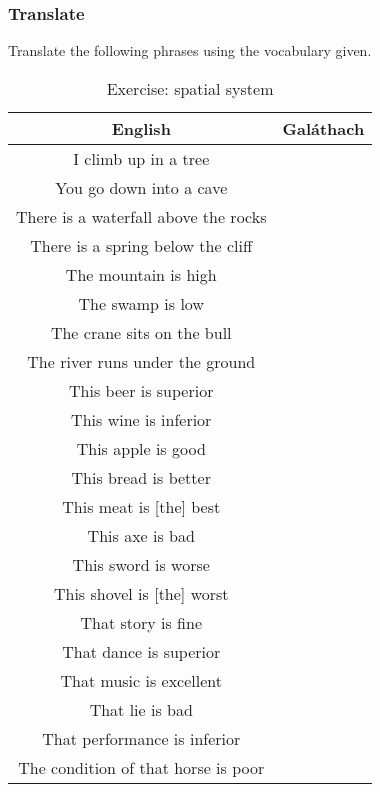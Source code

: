 \subsubsection{Translate}

Translate the following phrases using the vocabulary given.

\begin{table}[H]
\centering
\begin{tabular}{|c|M{5.0cm}|}
  \toprule
  \textbf{English} & \textbf{Gal\'{a}thach}\\
  \toprule
  I climb up in a tree & \\
  \midrule
  You go down into a cave & \\
  \midrule
  There is a waterfall above the rocks & \\
  \midrule
  There is a spring below the cliff & \\
  \midrule
  The mountain is high & \\
  \midrule
  The swamp is low & \\
  \midrule
  The crane sits on the bull & \\
  \midrule
  The river runs under the ground & \\
  \midrule
  This beer is superior & \\
  \midrule
  This wine is inferior & \\
  \midrule
  This apple is good & \\
  \midrule
  This bread is better & \\
  \midrule
  This meat is [the] best & \\
  \midrule
  This axe is bad & \\
  \midrule
  This sword is worse & \\
  \midrule
  This shovel is [the] worst & \\
  \midrule
  That story is fine & \\
  \midrule
  That dance is superior & \\
  \midrule
  That music is excellent & \\
  \midrule
  That lie is bad & \\
  \midrule
  That performance is inferior & \\
  \midrule
  The condition of that horse is poor & \\
  \bottomrule
\end{tabular}
\label{exercise_spatial_system}
\caption{Exercise: spatial system}
\end{table}

\newpage
